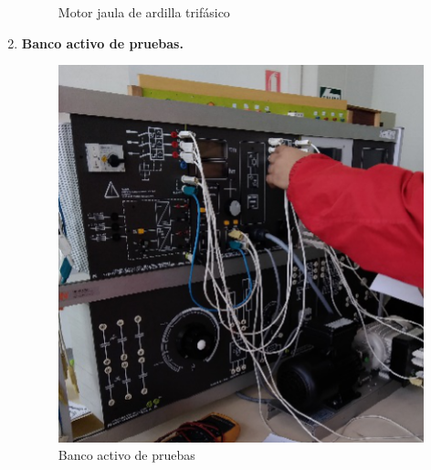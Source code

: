 \documentclass[a4paper,12pt]{article}
\begin{document}
\begin{enumerate}
\begin{figure}[H]
        \caption{Motor jaula de ardilla trifásico}
    \end{figure}
    \item \textbf{Banco activo de pruebas.}
    \begin{figure}[H]
        \centering
        \includegraphics[scale = 0.78]{banco_activo.png}
        \caption{Banco activo de pruebas}
    \end{figure}
\end{enumerate}
\end{document}
